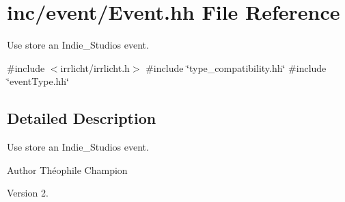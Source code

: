\hypertarget{Event_8hh}{}\section{inc/event/\+Event.hh File Reference}
\label{Event_8hh}


Use store an Indie\+\_\+\+Studio\textquotesingle{}s event.  


{\ttfamily \#include $<$irrlicht/irrlicht.\+h$>$}\newline
{\ttfamily \#include \char`\"{}type\+\_\+compatibility.\+hh\char`\"{}}\newline
{\ttfamily \#include \char`\"{}event\+Type.\+hh\char`\"{}}\newline


\subsection{Detailed Description}
Use store an Indie\+\_\+\+Studio\textquotesingle{}s event. 

\begin{DoxyAuthor}{Author}
Théophile Champion 
\end{DoxyAuthor}
\begin{DoxyVersion}{Version}
2. 
\end{DoxyVersion}
